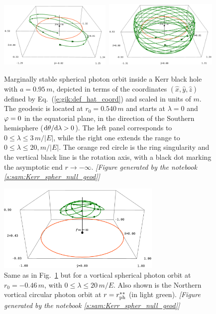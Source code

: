\begin{figure}
\centerline{\includegraphics[width=0.48\textwidth]{gik_spher_3d_ms_l030.png}\
\includegraphics[width=0.49\textwidth]{gik_spher_3d_ms_l200.png}}
\caption[]{\label{f:gik:spher_3d_ms} \footnotesize
Marginally stable spherical photon orbit inside a Kerr black hole with
$a=0.95\, m$, depicted in terms of the coordinates
$(\hat{x},\hat{y},\hat{z})$ defined by Eq.~(\ref{e:gik:def_hat_coord}) and scaled in units of $m$.
The geodesic is located at $r_0 = 0.540\, m$ and starts at $\lambda=0$ and $\varphi=0$ in the equatorial plane, in the direction
of the Southern hemisphere ($\mathrm{d}\theta/\mathrm{d}\lambda>0$).
The left panel corresponds to $0 \leq \lambda \leq 3\, m/|E|$,
while the right one extends the range to $0 \leq \lambda \leq 20, m/|E|$.
The orange red circle is the ring singularity and the vertical black line
is the rotation axis, with a black dot marking the asymptotic end $r\to -\infty$.
\textsl{[Figure generated by the notebook \ref{s:sam:Kerr_spher_null_geod}]}
}
\end{figure}

\begin{figure}
\centerline{\includegraphics[width=0.7\textwidth]{gik_spher_3d_r_m046.png}}
\caption[]{\label{f:gik:spher_3d_r_m046} \footnotesize
Same as in Fig.~\ref{f:gik:spher_3d_ms} but for a vortical
spherical photon orbit at $r_0=-0.46\, m$, with
$0 \leq \lambda \leq 20\, m/E$. Also shown is the Northern vortical circular photon orbit
at $r = r_{\rm ph}^{**}$ (in light green).
\textsl{[Figure generated by the notebook \ref{s:sam:Kerr_spher_null_geod}]}
}
\end{figure}


